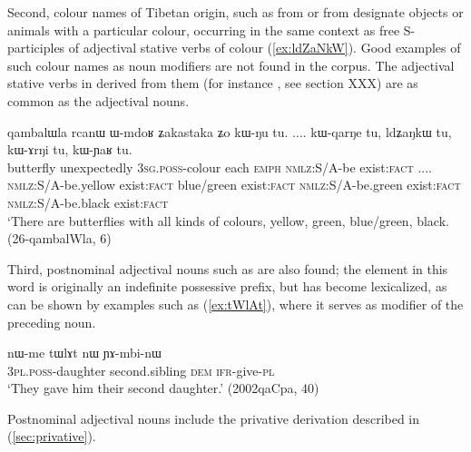 Second, colour names of Tibetan origin, such as  from  or  from  designate objects or animals with a particular colour, occurring in the same context as free S-participles of adjectival stative verbs of colour (\ref{ex:ldZaNkW}). Good examples of such colour names as noun modifiers are not found in the corpus. The adjectival stative verbs in  derived from them (for instance , see section XXX) are as common as the adjectival nouns.
 
\begin{exe}
\ex \label{ex:ldZaNkW}
 \gll qambalɯla rcanɯ ɯ-mdoʁ ʑakastaka ʑo kɯ-ŋu tu. .... kɯ-qarŋe tu, ldʑaŋkɯ tu, kɯ-ɤrŋi tu, kɯ-ɲaʁ tu. \\
 butterfly unexpectedly \textsc{3sg}.\textsc{poss}-colour each \textsc{emph} \textsc{nmlz}:S/A-be exist:\textsc{fact} .... \textsc{nmlz}:S/A-be.yellow exist:\textsc{fact} blue/green exist:\textsc{fact}  \textsc{nmlz}:S/A-be.green exist:\textsc{fact} \textsc{nmlz}:S/A-be.black exist:\textsc{fact}\\
 \glt `There are butterflies with all kinds of colours, yellow, green, blue/green, black. (26-qambalWla, 6)
\end{exe}

Third, postnominal adjectival nouns such as   are also found; the  element in this word is originally an indefinite possessive prefix, but has become lexicalized, as can be shown by examples such as (\ref{ex:tWlAt}), where it serves as modifier of the preceding noun.
 
\begin{exe}
\ex \label{ex:tWlAt}
\gll  nɯ-me tɯlɤt nɯ ɲɤ-mbi-nɯ \\
\textsc{3pl.poss}-daughter second.sibling \textsc{dem} \textsc{ifr}-give-\textsc{pl} \\
\glt `They gave him their second daughter.' (2002qaCpa, 40)
\end{exe} 
 
Postnominal adjectival nouns include the privative  derivation described in (\ref{sec:privative}). 


